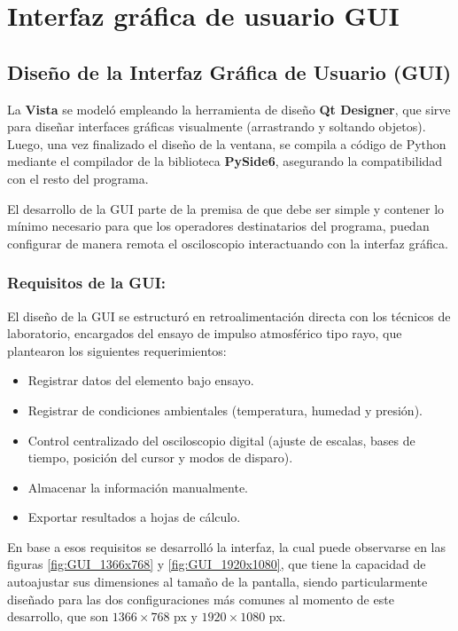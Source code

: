 \newpage
\chapter{Interfaz gráfica de usuario GUI}
\vspace{3\baselineskip}

\section{Diseño de la Interfaz Gráfica de Usuario (GUI)}
\label{subsec:diseno_gui}

La \textbf{Vista} se modeló empleando la herramienta de diseño \textbf{Qt Designer}, que sirve para diseñar interfaces gráficas visualmente (arrastrando y soltando objetos). Luego, una vez finalizado el diseño de la ventana, se compila a código de Python mediante el compilador de la biblioteca \textbf{PySide6}, asegurando la compatibilidad con el resto del programa.

El desarrollo de la GUI parte de la premisa de que debe ser simple y contener lo mínimo necesario para que los operadores destinatarios del programa, puedan configurar de manera remota el osciloscopio interactuando con la interfaz gráfica.

\subsection{Requisitos de la GUI:}

El diseño de la GUI se estructuró en retroalimentación directa con los técnicos de laboratorio, encargados del ensayo de impulso atmosférico tipo rayo, que plantearon los siguientes requerimientos:

\begin{itemize}
    \item Registrar datos del elemento bajo ensayo.
    \item Registrar de condiciones ambientales (temperatura, humedad y presión).
    \item Control centralizado del osciloscopio digital (ajuste de escalas, bases de tiempo, posición del cursor y modos de disparo).
    \item Almacenar la información manualmente.
    \item Exportar resultados a hojas de cálculo.
\end{itemize}

En base a esos requisitos se desarrolló la interfaz, la cual puede observarse en las figuras \ref{fig:GUI_1366x768} y \ref{fig:GUI_1920x1080}, que tiene la capacidad de autoajustar sus dimensiones al tamaño de la pantalla, siendo particularmente diseñado para las dos configuraciones más comunes al momento de este desarrollo, que son $1366 \times 768$ px y $1920 \times 1080$ px.

